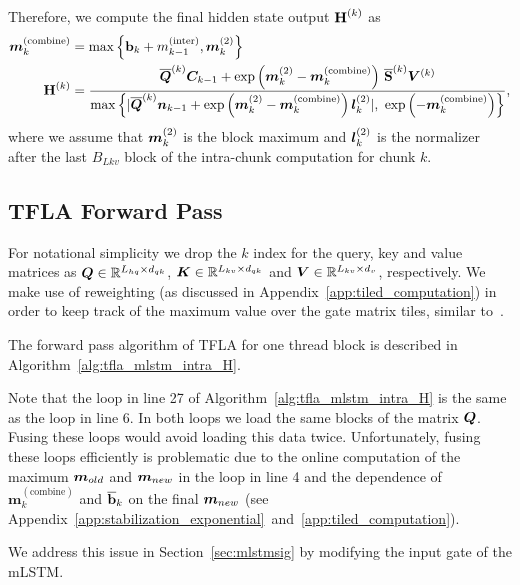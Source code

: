 \documentclass{article}
\newcommand{\minter}{{m}^{(\text{inter})}}
\newcommand{\mcombine}{\bm{m}^{(\text{combine})}}
\begin{document}
    Therefore, we compute the final hidden state output $\bm{\mathrm{H}}^{(k)}$ as
    \begin{align}
        \mcombine_k    & = \max \left\{ \bm{\Rb}_k + \minter_{k-1}, \Bm^{(2)}_k \right\}                                                               \\
        \bm{\rH}^{(k)} & = \frac{\overline{\BQ}^{(k)} \BC_{k-1} + \exp \left(\Bm^{(2)}_k - \mcombine_k \right) \, \overline{\bm{\rS}}^{(k)} \BV^{(k)}}
        {\max \left\{|\overline{\BQ}^{(k)} \bm{n}_{k-1} + \exp \left(\Bm^{(2)}_k - \mcombine_k \right) \Bl^{(2)}_k |, \, \, \exp \left(-\mcombine_k\right)\right\}},
    \end{align}
    where we assume that $\bm{m}^{(2)}_k$ is the block maximum and $\bm{l}^{(2)}_k$ is the normalizer after the last $B_{Lkv}$ block of the intra-chunk computation for chunk $k$.

    \subsection{TFLA Forward Pass}
    \label{app:tfla_forward_pass}
    For notational simplicity we drop the $k$ index for the query, key and value matrices as
    $\bm{Q} \in \mathbb{R}^{L_{hq} \times d_{qk}}$, $\bm{K} \in \mathbb{R}^{L_{kv} \times d_{qk}}$ and $\bm{V} \in \mathbb{R}^{L_{kv} \times d_v}$, respectively.
    We make use of reweighting (as discussed in Appendix~\ref{app:tiled_computation}) in order to keep track of the maximum value over the gate matrix tiles, similar to~\citep{dao:22flashattention}.

    The forward pass algorithm of TFLA for one thread block is described in Algorithm~\ref{alg:tfla_mlstm_intra_H}.

    Note that the loop in line 27 of Algorithm~\ref{alg:tfla_mlstm_intra_H} is the same as the loop in line 6.
    In both loops we load the same blocks of the matrix $\bm{Q}$.
    Fusing these loops would avoid loading this data twice.
    Unfortunately, fusing these loops efficiently is problematic due to the online computation of the maximum $\bm{m}_{old}$ and $\bm{m}_{new}$ in the loop in line 4 and
    the dependence of $\mcombine_k$ and $\overline{\bm{\mathrm{b}}}_k$ on the final $\bm{m}_{new}$ (see Appendix~\ref{app:stabilization_exponential}~and~\ref{app:tiled_computation}).

    We address this issue in Section~\ref{sec:mlstmsig} by modifying the input gate of the mLSTM.

    \newcommand{\nintra}{\bm{\Rn}^{(\text{intra})}}
    \newcommand{\ninter}{\bm{\Rn}^{(\text{inter})}}
    \newcommand{\Hcomb}{\bm{\rH}^{(\text{comb})}}
    \newcommand{\ncomb}{\bm{\Rn}^{(\text{comb})}}
\end{document}
